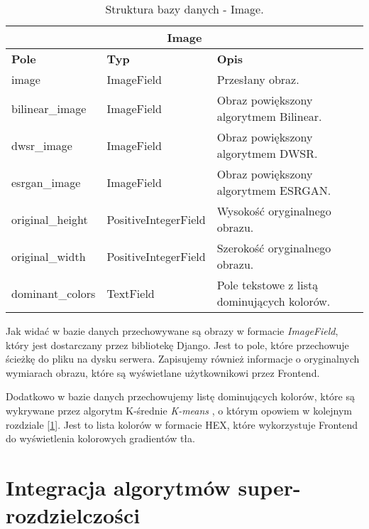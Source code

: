 \begin{table}[ht]
    \centering
    \renewcommand{\arraystretch}{1.5} %
    \begin{tabular}{|l|l|p{8cm}|}
    \hline
    \multicolumn{3}{|c|}{\textbf{Image}}                                                        \\ \hline
    \textbf{Pole}       & \textbf{Typ}          & \textbf{Opis}                                 \\ \hline
    image               & ImageField            & Przesłany obraz.                              \\ \hline
    bilinear\_image     & ImageField            & Obraz powiększony algorytmem Bilinear.        \\ \hline
    dwsr\_image         & ImageField            & Obraz powiększony algorytmem DWSR.            \\ \hline
    esrgan\_image       & ImageField            & Obraz powiększony algorytmem ESRGAN.          \\ \hline
    original\_height    & PositiveIntegerField  & Wysokość oryginalnego obrazu.                 \\ \hline
    original\_width     & PositiveIntegerField  & Szerokość oryginalnego obrazu.                \\ \hline
    dominant\_colors    & TextField             & Pole tekstowe z listą dominujących kolorów.   \\ \hline
    \end{tabular}
    \caption{Struktura bazy danych - Image.}
    \label{tab:image_model}
\end{table}

Jak widać w bazie danych przechowywane są obrazy w formacie \textit{ImageField}, który jest dostarczany przez bibliotekę Django. Jest to pole, które przechowuje ścieżkę do pliku na dysku serwera. Zapisujemy również informacje o oryginalnych wymiarach obrazu, które są wyświetlane użytkownikowi przez Frontend. 

Dodatkowo w bazie danych przechowujemy listę dominujących kolorów, które są wykrywane przez algorytm K-średnie \textit{K-means} \cite{sklearn} , o którym opowiem w kolejnym rozdziale [\ref{sec:implementation-s-r}]. Jest to lista kolorów w formacie HEX, które wykorzystuje Frontend do wyświetlenia kolorowych gradientów tła.



\section{Integracja algorytmów super-rozdzielczości} \label{sec:implementation-s-r}

